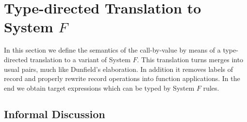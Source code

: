 \section{Type-directed Translation to System $ F $}

In this section we define the semantics of the call-by-value \name by means of a
type-directed translation to a variant of System $F$. This translation turns
merges into usual pairs, much like Dunfield's elaboration. In addition it
removes labels of record and properly rewrite record operations into function
applications. In the end we obtain target expressions which can be typed by
System $F$ rules.

\subsection{Informal Discussion}

